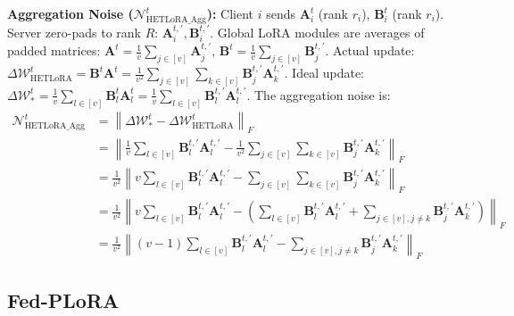 \documentclass{article} %
\newcommand{\mat}[1]{\mathbf{#1}}
\begin{document}
\textbf{Aggregation Noise ($\mathcal{N}_{\text{HETLoRA\_Agg}}^{t}$):} Client $i$ sends $\mat{A}_i^t$ (rank $r_i$), $\mat{B}_i^t$ (rank $r_i$). Server zero-pads to rank $R$: $\mat{A}_i^{t,\prime}, \mat{B}_i^{t,\prime}$.
Global LoRA modules are averages of padded matrices:
$\mat{A}^t = \frac{1}{v}\sum_{j\in[v]}\mat{A}_j^{t,\prime}$, $\mat{B}^t = \frac{1}{v}\sum_{j\in[v]}\mat{B}_j^{t,\prime}$.
Actual update: $\Delta\boldsymbol{\mathcal{W}}_{\text{HETLoRA}}^t = \mat{B}^t \mat{A}^t = \frac{1}{v^2} \sum_{j\in[v]} \sum_{k\in[v]} \mat{B}_j^{t,\prime} \mat{A}_k^{t,\prime}$.
Ideal update: $\Delta \boldsymbol{\mathcal{W}}_{*}^t = \frac{1}{v}\sum_{l\in[v]} \mat{B}_l^t \mat{A}_l^t = \frac{1}{v}\sum_{l\in[v]} \mat{B}_l^{t,\prime} \mat{A}_l^{t,\prime}$.
The aggregation noise is:
\begin{align*}
\mathcal{N}_{\text{HETLoRA\_Agg}}^{t} &= \left\| \Delta \boldsymbol{\mathcal{W}}_{*}^t - \Delta\boldsymbol{\mathcal{W}}_{\text{HETLoRA}}^t \right\|_F \\
&= \left\| \frac{1}{v}\sum_{l\in[v]} \mat{B}_l^{t,\prime} \mat{A}_l^{t,\prime} - \frac{1}{v^2} \sum_{j\in[v]} \sum_{k\in[v]} \mat{B}_j^{t,\prime} \mat{A}_k^{t,\prime} \right\|_F \\
&= \frac{1}{v^2} \left\| v\sum_{l\in[v]} \mat{B}_l^{t,\prime} \mat{A}_l^{t,\prime} - \sum_{j\in[v]} \sum_{k\in[v]} \mat{B}_j^{t,\prime} \mat{A}_k^{t,\prime} \right\|_F \\
&= \frac{1}{v^2} \left\| v\sum_{l\in[v]} \mat{B}_l^{t,\prime} \mat{A}_l^{t,\prime} - \left( \sum_{l\in[v]} \mat{B}_l^{t,\prime} \mat{A}_l^{t,\prime} + \sum_{j\in[v],j \neq k} \mat{B}_j^{t,\prime} \mat{A}_k^{t,\prime} \right) \right\|_F \\
&= \frac{1}{v^2} \left\| (v-1)\sum_{l\in[v]} \mat{B}_l^{t,\prime} \mat{A}_l^{t,\prime} - \sum_{j\in[v],j \neq k} \mat{B}_j^{t,\prime} \mat{A}_k^{t,\prime} \right\|_F
\end{align*}

\subsection{Fed-PLoRA}\label{appendixsubsection:fedplora}

\end{document}
